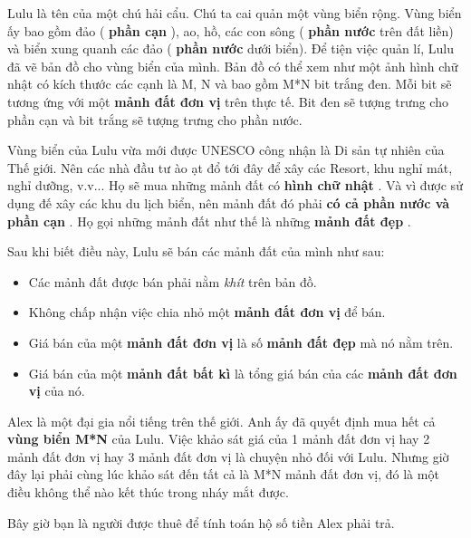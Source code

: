 



   Lulu là tên của một chú hải cẩu. Chú ta cai quản một vùng biển rộng. Vùng biển ấy bao gồm đảo (   \textbf{    phần cạn   }   ), ao, hồ, các con sông (   \textbf{    phần nước   }   trên đất liền) và biển xung quanh các đảo (   \textbf{    phần nước   }   dưới biển). Để tiện việc quản lí, Lulu đã vẽ bản đồ cho vùng biển của mình. Bản đồ có thể xem như một ảnh hình chữ nhật có kích thước các cạnh là M, N và bao gồm M*N bit trắng đen. Mỗi bit sẽ tương ứng với một   \textbf{    mảnh đất đơn vị   }   trên thực tế. Bit đen sẽ tượng trưng cho phần cạn và bit trắng sẽ tượng trưng cho phần nước.  

   Vùng biển của Lulu vừa mới được UNESCO công nhận là Di sản tự nhiên của Thế giới. Nên các nhà đầu tư ào ạt đổ tới đây để xây các Resort, khu nghỉ mát, nghỉ dưỡng, v.v... Họ sẽ mua những mảnh đất có   \textbf{    hình chữ nhật   }   . Và vì được sử dụng đế xây các khu du lịch biển, nên mảnh đất đó phải   \textbf{    có cả phần nước và phần cạn   }   . Họ gọi những mảnh đất như thế là   \textbf{}   những   \textbf{    mảnh đất đẹp   }   .  

   Sau khi biết điều này, Lulu sẽ bán các mảnh đất của mình như sau:  
\begin{itemize}
	\item     Các mảnh đất được bán phải nằm    \emph{     khít    }    trên bản đồ.   
	\item     Không chấp nhận việc chia nhỏ một    \textbf{     mảnh đất đơn vị    }    để bán.   
	\item     Giá bán của một    \textbf{     mảnh đất đơn vị    }    là số    \textbf{     mảnh đất đẹp    }    mà nó nằm trên.   
	\item     Giá bán của một    \textbf{     mảnh đất bất kì    }    là tổng giá bán của các    \textbf{     mảnh đất đơn vị    }    của nó.   
\end{itemize}

   Alex là một đại gia nổi tiếng trên thế giới. Anh ấy đã quyết định mua hết cả   \textbf{    vùng biển M*N   }   của Lulu. Việc khảo sát giá của 1 mảnh đất đơn vị hay 2 mảnh đất đơn vị hay 3 mảnh đất đơn vị là chuyện nhỏ đối với Lulu. Nhưng giờ đây lại phải cùng lúc khảo sát đến tất cả là M*N mảnh đất đơn vị, đó là một điều không thể nào kết thúc trong nháy mắt được.  

   Bây giờ bạn là người được thuê để tính toán hộ số tiền Alex phải trả.  
\begin{itemize}
\end{itemize}

